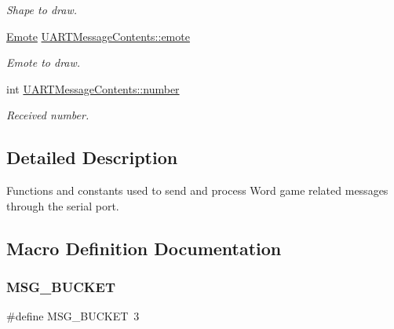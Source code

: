 \begin{DoxyCompactItemize}
\begin{DoxyCompactList}\small\item\em Shape to draw. \end{DoxyCompactList}\item 
\mbox{\hyperlink{group__emote_ga0e527855c554e31654c9beb340145574}{Emote}} \mbox{\hyperlink{group__uart__wordgame_ga91fba59102bf481eb5326e7ea57d1a2e}{U\+A\+R\+T\+Message\+Contents\+::emote}}
\begin{DoxyCompactList}\small\item\em Emote to draw. \end{DoxyCompactList}\item 
int \mbox{\hyperlink{group__uart__wordgame_gab03c4fe8fde542d8614dcafe1789ac44}{U\+A\+R\+T\+Message\+Contents\+::number}}
\begin{DoxyCompactList}\small\item\em Received number. \end{DoxyCompactList}\end{DoxyCompactItemize}


\subsection{Detailed Description}
Functions and constants used to send and process Word game related messages through the serial port. 

\subsection{Macro Definition Documentation}
\mbox{\label{group__uart__wordgame_ga230c3cd186dead8cdb8741fedcacae00}} 
\subsubsection{\texorpdfstring{M\+S\+G\+\_\+\+B\+U\+C\+K\+ET}{MSG\_BUCKET}}
{\footnotesize\ttfamily \#define M\+S\+G\+\_\+\+B\+U\+C\+K\+ET~3}

\mbox{\label{group__uart__wordgame_gab8e069b7d505e881a3ffe855d25d5387}} 
